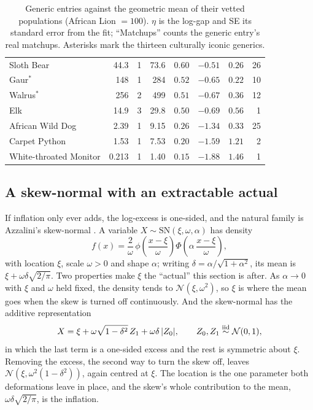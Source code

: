\documentclass[11pt]{article}
\begin{document}
\begin{table}[H]
\begin{tabular}{lrrrrrrr}
Sloth Bear & 44.3 & 1 & 73.6 & $0.60$ & $-0.51$ & $0.26$ & 26 \\
Gaur$^{\ast}$ & 148 & 1 & 284 & $0.52$ & $-0.65$ & $0.22$ & 10 \\
Walrus$^{\ast}$ & 256 & 2 & 499 & $0.51$ & $-0.67$ & $0.36$ & 12 \\
Elk & 14.9 & 3 & 29.8 & $0.50$ & $-0.69$ & $0.56$ & 1 \\
African Wild Dog & 2.39 & 1 & 9.15 & $0.26$ & $-1.34$ & $0.33$ & 25 \\
Carpet Python & 1.53 & 1 & 7.53 & $0.20$ & $-1.59$ & $1.21$ & 2 \\
White-throated Monitor & 0.213 & 1 & 1.40 & $0.15$ & $-1.88$ & $1.46$ & 1 \\
\bottomrule
\end{tabular}
\caption{Generic entries against the geometric mean of their vetted populations (African Lion $=100$). $\eta$ is the log-gap and SE its standard error from the fit; ``Matchups'' counts the generic entry's real matchups. Asterisks mark the thirteen culturally iconic generics.}
\label{tab:inflation_pairs}
\end{table}

\subsection{A skew-normal with an extractable actual}
If inflation only ever adds, the log-excess is one-sided, and the natural family is Azzalini's skew-normal \cite{azzalini1985,azzalini2014}. A variable $X\sim\mathrm{SN}(\xi,\omega,\alpha)$ has density
\begin{equation}
f(x)=\frac{2}{\omega}\,\phi\!\left(\frac{x-\xi}{\omega}\right)\Phi\!\left(\alpha\,\frac{x-\xi}{\omega}\right),
\end{equation}
with location $\xi$, scale $\omega>0$ and shape $\alpha$; writing $\delta=\alpha/\sqrt{1+\alpha^2}$, its mean is $\xi+\omega\delta\sqrt{2/\pi}$. Two properties make $\xi$ the ``actual'' this section is after. As $\alpha\to0$ with $\xi$ and $\omega$ held fixed, the density tends to $\mathcal N(\xi,\omega^2)$, so $\xi$ is where the mean goes when the skew is turned off continuously. And the skew-normal has the additive representation
\begin{equation}
X=\xi+\omega\sqrt{1-\delta^2}\,Z_1+\omega\delta\,|Z_0|,\qquad Z_0,Z_1\overset{\rm iid}{\sim}\mathcal N(0,1),
\label{eq:snrep}
\end{equation}
in which the last term is a one-sided excess and the rest is symmetric about $\xi$. Removing the excess, the second way to turn the skew off, leaves $\mathcal N(\xi,\omega^2(1-\delta^2))$, again centred at $\xi$. The location is the one parameter both deformations leave in place, and the skew's whole contribution to the mean, $\omega\delta\sqrt{2/\pi}$, is the inflation.
\end{document}
